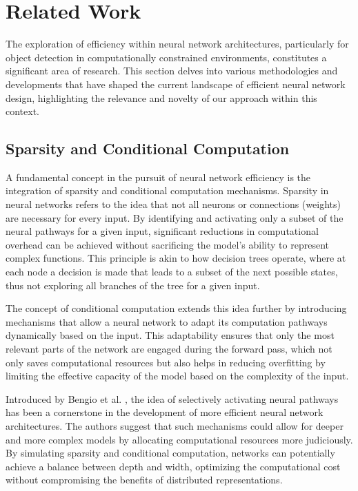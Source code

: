 \section{Related Work}  

The exploration of efficiency within neural network architectures, particularly for object detection in computationally constrained environments, constitutes a significant area of research. This section delves into various methodologies and developments that have shaped the current landscape of efficient neural network design, highlighting the relevance and novelty of our approach within this context.

\subsection{Sparsity and Conditional Computation}

A fundamental concept in the pursuit of neural network efficiency is the integration of sparsity and conditional computation mechanisms. Sparsity in neural networks refers to the idea that not all neurons or connections (weights) are necessary for every input. By identifying and activating only a subset of the neural pathways for a given input, significant reductions in computational overhead can be achieved without sacrificing the model's ability to represent complex functions. This principle is akin to how decision trees operate, where at each node a decision is made that leads to a subset of the next possible states, thus not exploring all branches of the tree for a given input.

The concept of conditional computation extends this idea further by introducing mechanisms that allow a neural network to adapt its computation pathways dynamically based on the input. This adaptability ensures that only the most relevant parts of the network are engaged during the forward pass, which not only saves computational resources but also helps in reducing overfitting by limiting the effective capacity of the model based on the complexity of the input.

Introduced by Bengio et al. \cite{bengio2013}, the idea of selectively activating neural pathways has been a cornerstone in the development of more efficient neural network architectures. The authors suggest that such mechanisms could allow for deeper and more complex models by allocating computational resources more judiciously. By simulating sparsity and conditional computation, networks can potentially achieve a balance between depth and width, optimizing the computational cost without compromising the benefits of distributed representations.

